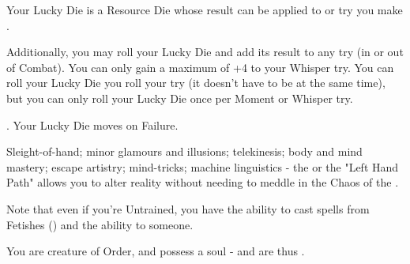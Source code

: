 \newpage
\begin{multicols*}{2}\raggedcolumns


  Your Lucky Die is a Resource Die whose result can be applied to  \RO or \RB try you make  . 

  Additionally, you may roll your Lucky Die and add its result to any  try (in or out of Combat). You can only gain a maximum of +4 to your Whisper try. You can roll your Lucky Die  you roll your try (it doesn't have to be at the same time), but you can only roll your Lucky Die once per Moment or Whisper try. 

. Your Lucky Die moves \DCDOWN on Failure.



  Sleight-of-hand; minor glamours and illusions; telekinesis; body and mind mastery; escape artistry; mind-tricks; machine linguistics - the  or the "Left Hand Path" allows you to alter reality without needing to meddle in the Chaos of the .


Note that even if you're Untrained, you have the ability to cast spells from Fetishes () and the ability to  someone.


    
  You are creature of Order, and possess a soul - and are thus .

    \cbreak



\end{multicols*}
